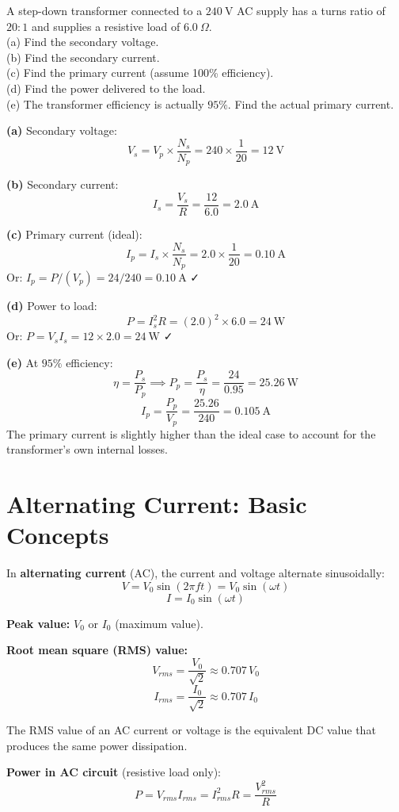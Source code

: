 \begin{examplebox}[24.5]
A step-down transformer connected to a $240\ \text{V}$
AC supply has a turns ratio of $20:1$ and supplies
a resistive load of $6.0\ \Omega$.\\
(a) Find the secondary voltage.\\
(b) Find the secondary current.\\
(c) Find the primary current (assume 100\% efficiency).\\
(d) Find the power delivered to the load.\\
(e) The transformer efficiency is actually $95\%$.
Find the actual primary current.
\end{examplebox}

\begin{solutionbox}
\textbf{(a)} Secondary voltage:
\[
  V_s = V_p \times \frac{N_s}{N_p}
  = 240 \times \frac{1}{20} = 12\ \text{V}
\]

\textbf{(b)} Secondary current:
\[
  I_s = \frac{V_s}{R} = \frac{12}{6.0} = 2.0\ \text{A}
\]

\textbf{(c)} Primary current (ideal):
\[
  I_p = I_s \times \frac{N_s}{N_p}
  = 2.0 \times \frac{1}{20} = 0.10\ \text{A}
\]
Or: $I_p = P/(V_p) = 24/240 = 0.10\ \text{A}$ ✓

\textbf{(d)} Power to load:
\[
  P = I_s^2 R = (2.0)^2 \times 6.0 = 24\ \text{W}
\]
Or: $P = V_s I_s = 12 \times 2.0 = 24\ \text{W}$ ✓

\textbf{(e)} At $95\%$ efficiency:
\[
  \eta = \frac{P_s}{P_p}
  \implies P_p = \frac{P_s}{\eta}
  = \frac{24}{0.95} = 25.26\ \text{W}
\]
\[
  I_p = \frac{P_p}{V_p} = \frac{25.26}{240}
  = 0.105\ \text{A}
\]
The primary current is slightly higher than the
ideal case to account for the transformer's own
internal losses.
\end{solutionbox}

\section{Alternating Current: Basic Concepts}

\begin{definitionbox}[AC Quantities]
In \textbf{alternating current} (AC), the current
and voltage alternate sinusoidally:
\[
  V = V_0\sin(2\pi ft) = V_0\sin(\omega t)
\]
\[
  I = I_0\sin(\omega t)
\]

\textbf{Peak value:} $V_0$ or $I_0$ (maximum value).

\textbf{Root mean square (RMS) value:}
\[
  V_{rms} = \frac{V_0}{\sqrt{2}} \approx 0.707\,V_0
\]
\[
  I_{rms} = \frac{I_0}{\sqrt{2}} \approx 0.707\,I_0
\]

The RMS value of an AC current or voltage is the
equivalent DC value that produces the same power
dissipation.

\textbf{Power in AC circuit} (resistive load only):
\[
  P = V_{rms}I_{rms} = I_{rms}^2R
  = \frac{V_{rms}^2}{R}
\]
\end{definitionbox}

